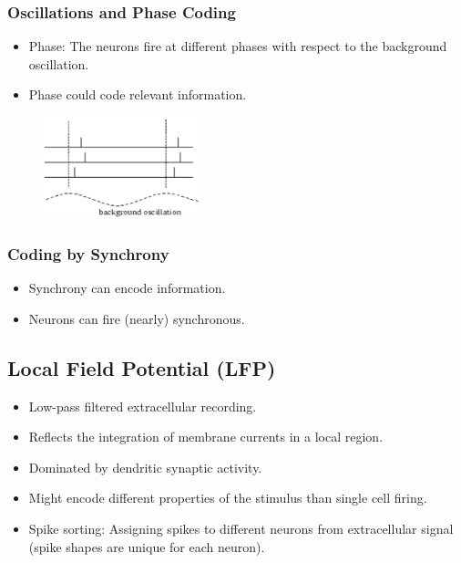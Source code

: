 \documentclass[a4paper, 12pt]{article}
\begin{document}
\subsubsection{Oscillations and Phase Coding}
\begin{itemize}[noitemsep,nolistsep]
	\item Phase: The neurons fire at different phases with respect to the background oscillation.
	\item Phase could code relevant information.
\end{itemize}
\begin{figure}[H]
	\centering
	\includegraphics[width=0.4\textwidth]{phase-code.png}
\end{figure}

\subsubsection{Coding by Synchrony}
\begin{itemize}[noitemsep,nolistsep]
	\item Synchrony can encode information.
	\item Neurons can fire (nearly) synchronous.
\end{itemize}

\subsection{Local Field Potential (LFP)}
\begin{itemize}[noitemsep,nolistsep]
	\item Low-pass filtered extracellular recording.
	\item Reflects the integration of membrane currents in a local region.
	\item Dominated by dendritic synaptic activity.
	\item Might encode different properties of the stimulus than single cell firing.
	\item Spike sorting: Assigning spikes to different neurons from extracellular signal (spike shapes are unique for each neuron).
\end{itemize}
\end{document}
